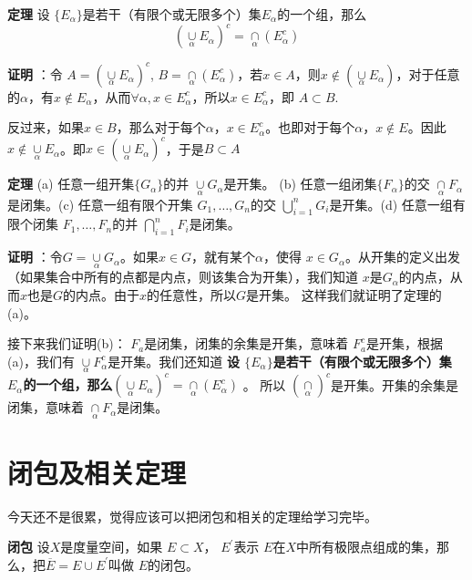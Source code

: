 \documentclass[10pt,a4paper,UTF8]{article}
\begin{document}
\textbf{定理} 设 \(\{E_{\alpha}\}\)是若干（有限个或无限多个）集\(E_{\alpha}\)的一个组，那么\[(\underset{\alpha}{\cup}E_{\alpha})^{c} = \underset{\alpha}{\cap}(E_{\alpha}^{c})\]

\textbf{证明} ：令 \(A = (\underset{\alpha}{\cup}E_{\alpha})^{c}\), \(B =  \underset{\alpha}{\cap}(E_{\alpha}^{c})\)，若\(x\in A\)，则\(x\notin (\underset{\alpha}{\cup}E_{\alpha})\)，对于任意的\(\alpha\)，有\(x\notin E_{\alpha}\)，从而\(\forall \alpha, x\in E_{\alpha}^{c}\)，所以\(x\in E_{\alpha}^{c}\)，即 \(A\subset B\).

反过来，如果\(x\in B\)，那么对于每个\(\alpha\)，\(x\in E_{\alpha}^{c}\)。也即对于每个\(\alpha\)，\(x\notin E\)。因此 \(x\notin \underset{\alpha}{\cup} E_{\alpha}\)。即\(x\in (\underset{\alpha}{\cup}E_{\alpha})^{c}\)，于是\(B\subset A\)

\textbf{定理} (a) 任意一组开集\(\{G_{\alpha}\}\)的并 \(\underset{\alpha}{\cup} G_{\alpha}\)是开集。 (b) 任意一组闭集\(\{F_{\alpha}\}\)的交 \(\underset{\alpha}{\cap} F_{\alpha}\)是闭集。(c) 任意一组有限个开集 \(G_{1},\ldots , G_{n}\)的交 \(\bigcup\limits_{i=1}^{n} G_{i}\)是开集。(d) 任意一组有限个闭集 \(F_{1},\ldots, F_{n}\)的并 \(\bigcap\limits_{i=1}^{n}F_{i}\)是闭集。

\textbf{证明} ：令\(G=\underset{\alpha}{\cup} G_{\alpha}\)。如果\(x\in G\)，就有某个\(\alpha\)，使得 \(x\in G_{\alpha}\)。从开集的定义出发（如果集合中所有的点都是内点，则该集合为开集），我们知道 \(x\)是\(G_{\alpha}\)的内点，从而\(x\)也是\(G\)的内点。由于\(x\)的任意性，所以\(G\)是开集。 这样我们就证明了定理的(a)。

接下来我们证明(b)： \(F_{a}\)是闭集，闭集的余集是开集，意味着 \(F_{a}^{c}\)是开集，根据(a)，我们有 \(\underset{\alpha}{\cup}F_{\alpha}^{c}\)是开集。我们还知道 \textbf{设 \(\{E_{\alpha}\}\)是若干（有限个或无限多个）集\(E_{\alpha}\)的一个组，那么\((\underset{\alpha}{\cup}E_{\alpha})^{c} = \underset{\alpha}{\cap}(E_{\alpha}^{c})\)} 。 所以 \((\underset{\alpha}{\cap})^{c}\)是开集。开集的余集是闭集，意味着 \(\underset{\alpha}{\cap}F_{\alpha}\)是闭集。

\section{闭包及相关定理}
\label{sec:orgheadline4}


今天还不是很累，觉得应该可以把闭包和相关的定理给学习完毕。

\textbf{闭包} 设\(X\)是度量空间，如果 \(E\subset X\)， \(E^{'}\)表示 \(E\)在\(X\)中所有极限点组成的集，那么，把\(\overline{E} = E\cup E^{'}\)叫做 \(E\)的闭包。
\end{document}

